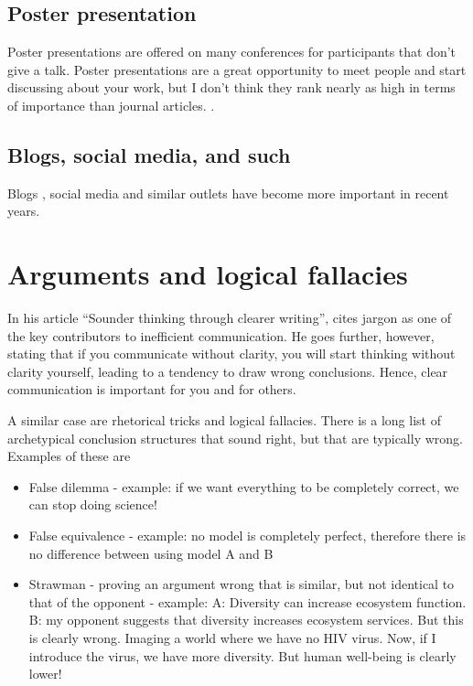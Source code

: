 \documentclass{tufte-book}
\begin{document}
\subsection{Poster presentation}

Poster presentations are offered on many conferences for participants that don't give a talk. Poster presentations are a great opportunity to meet people and start discussing about your work, but I don't think they rank nearly as high in terms of importance than journal articles. . 


\subsection{Blogs, social media, and such}

Blogs , social media and similar outlets have become more important in recent years. 


\section{Arguments and logical fallacies}

In his article ``Sounder thinking through clearer writing'', \citet{Woodford-Sounderthinkingthrough-1967} cites jargon as one of the key contributors to inefficient communication. He goes further, however, stating that if you communicate without clarity, you will start thinking without clarity yourself, leading to a tendency to draw wrong conclusions. Hence, clear communication is important for you and for others.


A similar case are rhetorical tricks and logical fallacies. There is a long list of archetypical conclusion structures that sound right, but that are typically wrong. Examples of these are

\begin{itemize}
\item False dilemma - example: if we want everything to be completely correct, we can stop doing science!
\item False equivalence - example: no model is completely perfect, therefore there is no difference between using model A and B
\item Strawman - proving an argument wrong that is similar, but not identical to that of the opponent -  example: A: Diversity can increase ecosystem function. B: my opponent suggests that diversity increases ecosystem services. But this is clearly wrong. Imaging a world where we have no HIV virus. Now, if I introduce the virus, we have more diversity. But human well-being is clearly lower!
\end{itemize}
\end{document}
